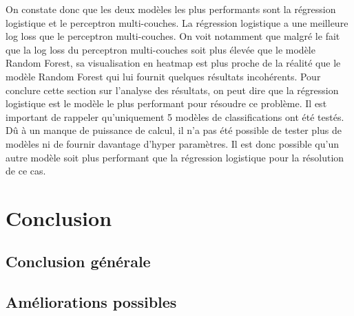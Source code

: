 \documentclass[12pt]{article}
\begin{document}
On constate donc que les deux modèles les plus performants sont la régression logistique et le perceptron multi-couches.
La régression logistique a une meilleure log loss que le perceptron multi-couches.
On voit notamment que malgré le fait que la log loss du perceptron multi-couches soit plus élevée que le modèle Random Forest, sa visualisation en heatmap est plus proche de la réalité que le modèle Random Forest qui lui fournit quelques résultats incohérents.
\newline\newline
Pour conclure cette section sur l'analyse des résultats, on peut dire que la régression logistique est le modèle le plus performant pour résoudre ce problème. 
Il est important de rappeler qu'uniquement 5 modèles de classifications ont été testés.
Dû à un manque de puissance de calcul, il n'a pas été possible de tester plus de modèles ni de fournir davantage d'hyper paramètres.
Il est donc possible qu'un autre modèle soit plus performant que la régression logistique pour la résolution de ce cas.
\newpage
\section{Conclusion}

\subsection{Conclusion générale}
\subsection{Améliorations possibles}




\end{document}
